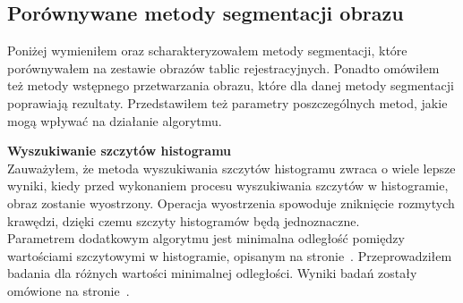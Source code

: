 \subsection{Porównywane metody segmentacji obrazu}
Poniżej wymieniłem oraz scharakteryzowałem metody segmentacji, które porównywałem na zestawie obrazów tablic rejestracyjnych. Ponadto omówiłem też metody wstępnego przetwarzania obrazu, które dla danej metody segmentacji poprawiają rezultaty. Przedstawiłem też parametry poszczególnych metod, jakie mogą wpływać na działanie algorytmu.

\textbf{Wyszukiwanie szczytów histogramu}\\
Zauważyłem, że metoda wyszukiwania szczytów histogramu zwraca o wiele lepsze wyniki, kiedy przed wykonaniem procesu wyszukiwania szczytów w histogramie, obraz zostanie wyostrzony. Operacja wyostrzenia spowoduje zniknięcie rozmytych krawędzi, dzięki czemu szczyty histogramów będą jednoznaczne. \\
Parametrem dodatkowym algorytmu jest minimalna odległość pomiędzy wartościami szczytowymi w histogramie, opisanym na stronie~\pageref{sssec:histogram_peaks}. Przeprowadziłem badania dla różnych wartości minimalnej odległości. Wyniki badań zostały omówione na stronie~\pageref{sssec:histogram_peaks_results}.\\

